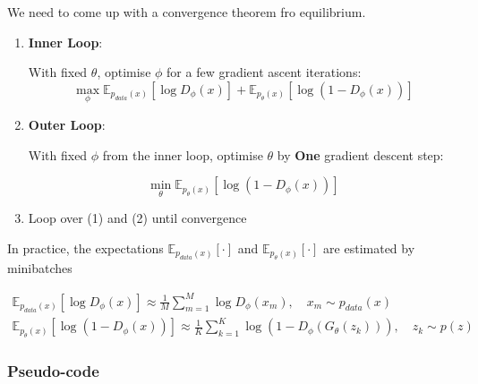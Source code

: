 \documentclass[11pt]{article}
\begin{document}
We need to come up with a convergence theorem fro equilibrium.

\begin{enumerate}
    \item \textbf{Inner Loop}:
    
    With fixed $\theta$, optimise $\phi$ for a few gradient ascent iterations:
    \begin{equation}
        \max_\phi \mathbb E_{p_{data}(x)}[\log D_\phi(x)] + \mathbb E_{p_\theta(x)}[\log(1-D_\phi(x))]
    \end{equation}

    \item \textbf{Outer Loop}:
    
    With fixed $\phi$ from the inner loop, optimise $\theta$ by \textbf{One} gradient descent step:

    \begin{equation}
        \min_\theta \mathbb E_{p_\theta(x)}[\log(1- D_\phi(x))]
    \end{equation}

    \item Loop over (1) and (2) until convergence

\end{enumerate}

In practice, the expectations $\mathbb E_{p_{data}(x)}[\cdot]$ and $\mathbb E_{p_\theta(x)}[\cdot]$ are estimated by minibatches

\begin{gather}
    \mathbb E_{p_{data}(x)}[\log D_\phi(x)] \approx \frac 1 M \sum^M_{m=1} \log D_\phi(x_m), \quad x_m \sim p_{data}(x) \\
    \mathbb E_{p_\theta(x)}[\log(1-D_\phi(x))] \approx \frac 1 K \sum^K_{k=1} \log(1-D_\phi(G_\theta(z_k))), \quad z_k \sim p(z)
\end{gather}

\subsubsection{Pseudo-code}

\begin{figure}[H]
    \centering
\end{figure}
\end{document}
